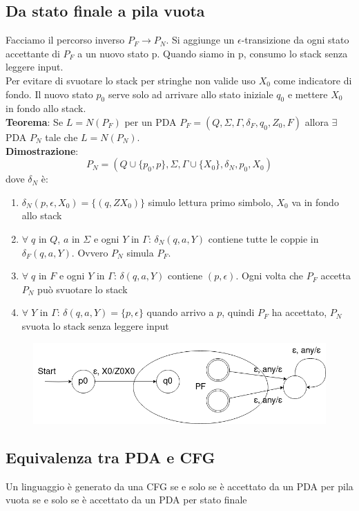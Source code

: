 \documentclass[12pt]{article}
\begin{document}
\subsection{Da stato finale a pila vuota}
Facciamo il percorso inverso $P_F \rightarrow P_N$. Si aggiunge un $\epsilon$-transizione da ogni stato accettante di $P_F$ a un nuovo stato p. Quando siamo in p, consumo lo stack senza leggere input. 
\\ Per evitare di svuotare lo stack per stringhe non valide uso $X_0$ come indicatore di fondo. Il nuovo stato $p_0$ serve solo ad arrivare allo stato iniziale $q_0$ e mettere $X_0$ in fondo allo stack. 
\\ \textbf{Teorema}: Se $L=N(P_F)$ per un PDA $P_F=(Q,\Sigma, \Gamma, \delta_F, q_0, Z_0, F)$ allora $\exists$ PDA $P_N$ tale che $L=N(P_N)$.
\\ \textbf{Dimostrazione}: 
\[ P_N = (Q \cup \{p_0, p\}, \Sigma,\Gamma \cup \{X_0\}, \delta_N,p_0,X_0) \]
dove $\delta_N$ è:
\begin{enumerate}
  \item $\delta_N(p,\epsilon, X_0) = \{(q,ZX_0)\}$ simulo lettura primo simbolo, $X_0$ va in fondo allo stack
  \item $\forall \; q$ in $Q$, $a$ in $\Sigma$ e ogni $Y$ in $\Gamma$: $\delta_N(q,a,Y)$ contiene tutte le coppie  in $\delta_F(q,a,Y)$. Ovvero $P_N$ simula $P_F$.
  \item $\forall \; q$ in $F$ e ogni $Y$ in $\Gamma$: $\delta(q,a,Y)$ contiene $(p,\epsilon)$. Ogni volta che $P_F$ accetta $P_N$ può svuotare lo stack
  \item $\forall \; Y$ in $\Gamma$: $\delta(q,a,Y) = \{p, \epsilon\}$ quando arrivo a $p$, quindi $P_F$ ha accettato, $P_N$ svuota lo stack senza leggere input
\end{enumerate}

\begin{figure}[ht]
  \includegraphics[scale = 0.4]{media/cfg_pda.png}
  \centering
\end{figure}

\newpage
\subsection{Equivalenza tra PDA e CFG} 
Un linguaggio è
generato da una CFG
se e solo se è
accettato da un PDA per pila vuota
se e solo se è
accettato da un PDA per stato finale
\end{document}
